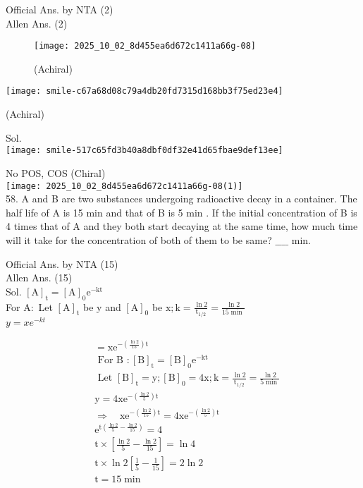 \documentclass[10pt]{article}
\begin{document}
Official Ans. by NTA (2)\\
Allen Ans. (2)

\begin{figure}[h]
\begin{center}
  \texttt{[image: 2025\_10\_02\_8d455ea6d672c1411a66g-08]}
\captionsetup{labelformat=empty}
\caption{(Achiral)}
\end{center}
\end{figure}

\texttt{[image: smile-c67a68d08c79a4db20fd7315d168bb3f75ed23e4]}

(Achiral)

Sol.\\
\texttt{[image: smile-517c65fd3b40a8dbf0df32e41d65fbae9def13ee]}

No POS, COS (Chiral)\\
\texttt{[image: 2025\_10\_02\_8d455ea6d672c1411a66g-08(1)]}\\
58. A and B are two substances undergoing radioactive decay in a container. The half life of A is 15 min and that of B is 5 min . If the initial concentration of B is 4 times that of A and they both start decaying at the same time, how much time will it take for the concentration of both of them to be same? \(\_\_\_\_\) min.

Official Ans. by NTA (15)\\
Allen Ans. (15)\\
Sol. \([\mathrm{A}]_{\mathrm{t}}=[\mathrm{A}]_{0} \mathrm{e}^{-\mathrm{kt}}\)\\
For \(\mathrm{A}:\) Let \([\mathrm{A}]_{\mathrm{t}}\) be y and \([\mathrm{A}]_{0}\) be \(\mathrm{x} ; \mathrm{k}=\frac{\ln 2}{\mathrm{t}_{1 / 2}}= \frac{\ln 2}{15 \min }\)\\
\(y=x e^{-k t}\)

\[
\begin{aligned}
& =\mathrm{xe}^{-\left(\frac{\ln 2}{15}\right) \mathrm{t}} \\
& \text { For B }:[\mathrm{B}]_{\mathrm{t}}=[\mathrm{B}]_{0} \mathrm{e}^{-\mathrm{kt}} \\
& \text { Let }[\mathrm{B}]_{\mathrm{t}}=\mathrm{y} ;[\mathrm{B}]_{0}=4 \mathrm{x} ; \mathrm{k}=\frac{\ln 2}{\mathrm{t}_{1 / 2}}=\frac{\ln 2}{5 \min } \\
& \mathrm{y}=4 \mathrm{xe}^{-\left(\frac{\ln 2}{5}\right) \mathrm{t}} \\
& \Rightarrow \quad \mathrm{xe}^{-\left(\frac{\ln 2}{15}\right) \mathrm{t}}=4 \mathrm{xe}^{-\left(\frac{\ln 2}{5}\right) \mathrm{t}} \\
& \mathrm{e}^{\mathrm{t}\left(\frac{\ln 2}{5}-\frac{\ln 2}{15}\right)}=4 \\
& \mathrm{t} \times\left[\frac{\ln 2}{5}-\frac{\ln 2}{15}\right]=\ln 4 \\
& \mathrm{t} \times \ln 2\left[\frac{1}{5}-\frac{1}{15}\right]=2 \ln 2 \\
& \mathrm{t}=15 \min
\end{aligned}
\]
\end{document}
